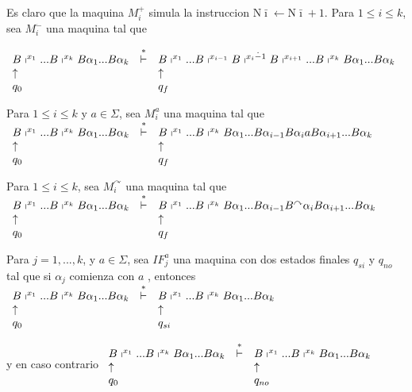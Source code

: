 Es claro que la maquina \(M_{i}^{+}\) simula la instruccion \(\mathrm{N}\bar{ \imath}\leftarrow \mathrm{N}\bar{\imath}+1\).
Para \(1\leq i\leq k\), sea \(M_{i}^{\dot{-}}\) una maquina tal que

\(\displaystyle \begin{array}{lcl} B\shortmid ^{x_{1}}...B\shortmid ^{x_{k}}B\alpha _{1}...B\alpha _{k} & \overset{\ast }{\vdash } & B\shortmid ^{x_{1}}...B\shortmid ^{x_{i-1}}B\shortmid ^{x_{i}\dot{-}1}B\shortmid ^{x_{i+1}}...B\shortmid ^{x_{k}}B\alpha _{1}...B\alpha _{k} \\ \uparrow & & \uparrow \\ q_{0} & & q_{f} \end{array} \)

Para \(1\leq i\leq k\) y \(a\in \Sigma \), sea \(M_{i}^{a}\) una maquina tal que
\(\displaystyle \begin{array}{lcl} B\shortmid ^{x_{1}}...B\shortmid ^{x_{k}}B\alpha _{1}...B\alpha _{k} & \overset{\ast }{\vdash } & B\shortmid ^{x_{1}}...B\shortmid ^{x_{k}}B\alpha _{1}...B\alpha _{i-1}B\alpha _{i}aB\alpha _{i+1}...B\alpha _{k} \\ \uparrow & & \uparrow \\ q_{0} & & q_{f} \end{array} \)

Para \(1\leq i\leq k\), sea \(M_{i}^{\curvearrowright }\) una maquina tal que
\(\displaystyle \begin{array}{lcl} B\shortmid ^{x_{1}}...B\shortmid ^{x_{k}}B\alpha _{1}...B\alpha _{k} & \overset{\ast }{\vdash } & B\shortmid ^{x_{1}}...B\shortmid ^{x_{k}}B\alpha _{1}...B\alpha _{i-1}B^{\curvearrowright }\alpha _{i}B\alpha _{i+1}...B\alpha _{k} \\ \uparrow & & \uparrow \\ q_{0} & & q_{f} \end{array} \)

Para \(j=1,...,k\), y \(a\in \Sigma \), sea \(IF_{j}^{a}\) una maquina con dos estados finales \(q_{si}\) y \(q_{no}\) tal que si \(\alpha _{j}\) comienza con \(a\) , entonces
\(\displaystyle \begin{array}{lcl} B\shortmid ^{x_{1}}...B\shortmid ^{x_{k}}B\alpha _{1}...B\alpha _{k} & \overset{\ast }{\vdash } & B\shortmid ^{x_{1}}...B\shortmid ^{x_{k}}B\alpha _{1}...B\alpha _{k} \\ \uparrow & & \uparrow \\ q_{0} & & q_{si} \end{array} \)

y en caso contrario
\(\displaystyle \begin{array}{lcl} B\shortmid ^{x_{1}}...B\shortmid ^{x_{k}}B\alpha _{1}...B\alpha _{k} & \overset{\ast }{\vdash } & B\shortmid ^{x_{1}}...B\shortmid ^{x_{k}}B\alpha _{1}...B\alpha _{k} \\ \uparrow & & \uparrow \\ q_{0} & & q_{no} \end{array} \)

